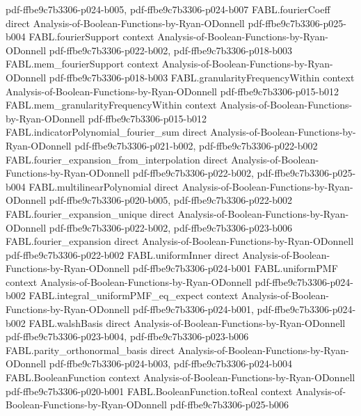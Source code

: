 \begin{theorem}
{    pdf-ffbe9c7b3306-p024-b005,
    pdf-ffbe9c7b3306-p024-b007}
\proofstep
  {FABL.fourierCoeff}
  {direct}
  {Analysis-of-Boolean-Functions-by-Ryan-ODonnell}
  {pdf-ffbe9c7b3306-p025-b004}
\proofstep
  {FABL.fourierSupport}
  {context}
  {Analysis-of-Boolean-Functions-by-Ryan-ODonnell}
  {pdf-ffbe9c7b3306-p022-b002,
    pdf-ffbe9c7b3306-p018-b003}
\proofstep
  {FABL.mem_fourierSupport}
  {context}
  {Analysis-of-Boolean-Functions-by-Ryan-ODonnell}
  {pdf-ffbe9c7b3306-p018-b003}
\proofstep
  {FABL.granularityFrequencyWithin}
  {context}
  {Analysis-of-Boolean-Functions-by-Ryan-ODonnell}
  {pdf-ffbe9c7b3306-p015-b012}
\proofstep
  {FABL.mem_granularityFrequencyWithin}
  {context}
  {Analysis-of-Boolean-Functions-by-Ryan-ODonnell}
  {pdf-ffbe9c7b3306-p015-b012}
\proofstep
  {FABL.indicatorPolynomial_fourier_sum}
  {direct}
  {Analysis-of-Boolean-Functions-by-Ryan-ODonnell}
  {pdf-ffbe9c7b3306-p021-b002,
    pdf-ffbe9c7b3306-p022-b002}
\proofstep
  {FABL.fourier_expansion_from_interpolation}
  {direct}
  {Analysis-of-Boolean-Functions-by-Ryan-ODonnell}
  {pdf-ffbe9c7b3306-p022-b002,
    pdf-ffbe9c7b3306-p025-b004}
\proofstep
  {FABL.multilinearPolynomial}
  {direct}
  {Analysis-of-Boolean-Functions-by-Ryan-ODonnell}
  {pdf-ffbe9c7b3306-p020-b005,
    pdf-ffbe9c7b3306-p022-b002}
\proofstep
  {FABL.fourier_expansion_unique}
  {direct}
  {Analysis-of-Boolean-Functions-by-Ryan-ODonnell}
  {pdf-ffbe9c7b3306-p022-b002,
    pdf-ffbe9c7b3306-p023-b006}
\proofstep
  {FABL.fourier_expansion}
  {direct}
  {Analysis-of-Boolean-Functions-by-Ryan-ODonnell}
  {pdf-ffbe9c7b3306-p022-b002}
\proofstep
  {FABL.uniformInner}
  {direct}
  {Analysis-of-Boolean-Functions-by-Ryan-ODonnell}
  {pdf-ffbe9c7b3306-p024-b001}
\proofstep
  {FABL.uniformPMF}
  {context}
  {Analysis-of-Boolean-Functions-by-Ryan-ODonnell}
  {pdf-ffbe9c7b3306-p024-b002}
\proofstep
  {FABL.integral_uniformPMF_eq_expect}
  {context}
  {Analysis-of-Boolean-Functions-by-Ryan-ODonnell}
  {pdf-ffbe9c7b3306-p024-b001,
    pdf-ffbe9c7b3306-p024-b002}
\proofstep
  {FABL.walshBasis}
  {direct}
  {Analysis-of-Boolean-Functions-by-Ryan-ODonnell}
  {pdf-ffbe9c7b3306-p023-b004,
    pdf-ffbe9c7b3306-p023-b006}
\proofstep
  {FABL.parity_orthonormal_basis}
  {direct}
  {Analysis-of-Boolean-Functions-by-Ryan-ODonnell}
  {pdf-ffbe9c7b3306-p024-b003,
    pdf-ffbe9c7b3306-p024-b004}
\proofstep
  {FABL.BooleanFunction}
  {context}
  {Analysis-of-Boolean-Functions-by-Ryan-ODonnell}
  {pdf-ffbe9c7b3306-p020-b001}
\proofstep
  {FABL.BooleanFunction.toReal}
  {context}
  {Analysis-of-Boolean-Functions-by-Ryan-ODonnell}
  {pdf-ffbe9c7b3306-p025-b006}

\end{theorem}
